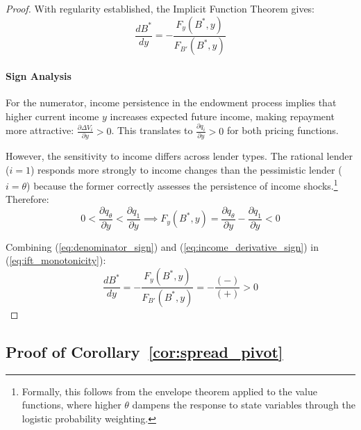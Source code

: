 \documentclass[12pt]{article}
\theoremstyle{plain}
\begin{document}
\begin{proof}
	With regularity established, the Implicit Function Theorem gives:
	\begin{equation}
		\frac{dB^*}{dy} = - \frac{F_y(B^*, y)}{F_{B'}(B^*, y)} \label{eq:ift_monotonicity}
	\end{equation}

	\paragraph{Sign Analysis} For the numerator, income persistence in the endowment process implies that
	higher current income $y$ increases expected future income, making repayment
	more attractive: $\frac{\partial \Delta V_i}{\partial y} > 0$. This translates
	to $\frac{\partial q_i}{\partial y} > 0$ for both pricing functions.

	However, the sensitivity to income differs across lender types. The rational
	lender ($i=1$) responds more strongly to income changes than the pessimistic
	lender ($i=\theta$) because the former correctly assesses the persistence of
	income shocks.\footnote{Formally, this follows from the envelope theorem
		applied to the value functions, where higher $\theta$ dampens the response to
		state variables through the logistic probability weighting.} Therefore:
	\begin{equation}
		0 < \frac{\partial q_\theta}{\partial y} < \frac{\partial q_1}{\partial y} \implies F_y(B^*, y) = \frac{\partial q_\theta}{\partial y} - \frac{\partial q_1}{\partial y} < 0 \label{eq:income_derivative_sign}
	\end{equation}

	Combining (\ref{eq:denominator_sign}) and (\ref{eq:income_derivative_sign}) in
	(\ref{eq:ift_monotonicity}):
	\begin{equation}
		\frac{dB^*}{dy} = -\frac{F_y(B^*, y)}{F_{B'}(B^*, y)} = -\frac{(-)}{(+)} > 0 \label{eq:monotonicity_conclusion}
	\end{equation}
\end{proof}

\subsection{Proof of Corollary~\ref{cor:spread_pivot}}\label{app:proof_spread_pivot}
\end{document}
